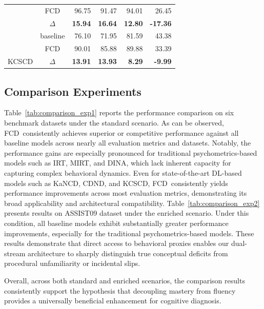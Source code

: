 \documentclass[runningheads]{llncs}
\def\mymethod{FCD}
\newcommand{\redbf}[1]{\textcolor{myred}{\textbf{#1}}} %
\begin{document}
\begin{table}[t]
{\begin{tabular}{cc|rrrr}
\rowcolor{mybgc}& \mymethod   & 96.75 & 91.47 & 94.01 & 26.45 \\
\rowcolor{mybgc}\multirow{-3}{*}{CDND}& $\Delta$    & \redbf{15.94} & \redbf{16.64} & \redbf{12.80} & \redbf{-17.36}\\
&baseline& 76.10 & 71.95 & 81.59 & 43.38 \\
& \mymethod   & 90.01 & 85.88 & 89.88 & 33.39 \\
\multirow{-3}{*}{KCSCD}& $\Delta$    & \redbf{13.91} & \redbf{13.93} & \redbf{8.29}  & \redbf{-9.99}\\
\bottomrule
\end{tabular}
}
\end{table}



\subsection{Comparison Experiments}

Table~\ref{tab:comparison_exp1} reports the performance comparison on six benchmark datasets under the standard scenario. As can be observed, \mymethod\ consistently achieves superior or competitive performance against all baseline models across nearly all evaluation metrics and datasets. Notably, the performance gains are especially pronounced for traditional psychometrics-based models such as IRT, MIRT, and DINA, which lack inherent capacity for capturing complex behavioral dynamics. Even for state-of-the-art DL-based models such as KaNCD, CDND, and KCSCD, \mymethod\ consistently yields performance improvements across most evaluation metrics, demonstrating its broad applicability and architectural compatibility. 
Table~\ref{tab:comparison_exp2} presents results on ASSIST09 dataset under the enriched scenario. Under this condition, all baseline models exhibit substantially greater performance improvements, especially for the traditional psychometrics-based models. These results demonstrate that direct access to behavioral proxies enables our dual-stream architecture to sharply distinguish true conceptual deficits from procedural unfamiliarity or incidental slips.

Overall, across both standard and enriched scenarios, the comparison results consistently support the hypothesis that decoupling mastery from fluency provides a universally beneficial enhancement for cognitive diagnosis.
\end{document}
